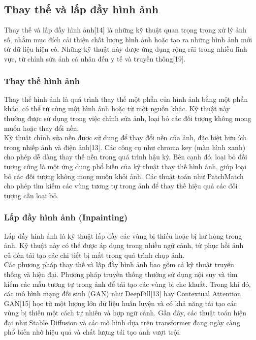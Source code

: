 \documentclass[12pt]{report}
\begin{document}
\subsection{Thay thế và lấp đầy hình ảnh}

Thay thế và lấp đầy hình ảnh[14] là những kỹ thuật quan trọng trong xử lý ảnh số, nhằm mục đích cải thiện chất lượng hình ảnh hoặc tạo ra những hình ảnh mới từ dữ liệu hiện có. Những kỹ thuật này được ứng dụng rộng rãi trong nhiều lĩnh vực, từ chỉnh sửa ảnh cá nhân đến y tế và truyền thông[19].

\subsubsection{Thay thế hình ảnh}

Thay thế hình ảnh là quá trình thay thế một phần của hình ảnh bằng một phần khác, có thể từ cùng một hình ảnh hoặc từ một nguồn khác. Kỹ thuật này thường được sử dụng trong việc chỉnh sửa ảnh, loại bỏ các đối tượng không mong muốn hoặc thay đổi nền.
\\Kỹ thuật chỉnh sửa nền được sử dụng để thay đổi nền của ảnh, đặc biệt hữu ích trong nhiếp ảnh và điện ảnh[13]. Các công cụ như chroma key (màn hình xanh) cho phép dễ dàng thay thế nền trong quá trình hậu kỳ. Bên cạnh đó, loại bỏ đối tượng cũng là một ứng dụng phổ biến của kỹ thuật thay thế hình ảnh, giúp loại bỏ các đối tượng không mong muốn khỏi ảnh. Các thuật toán như PatchMatch cho phép tìm kiếm các vùng tương tự trong ảnh để thay thế hiệu quả các đối tượng cần loại bỏ.

\subsubsection{Lấp đầy hình ảnh (Inpainting)}

Lấp đầy hình ảnh là kỹ thuật lấp đầy các vùng bị thiếu hoặc bị hư hỏng trong ảnh. Kỹ thuật này có thể được áp dụng trong nhiều ngữ cảnh, từ phục hồi ảnh cũ đến tái tạo các chi tiết bị mất trong quá trình chụp ảnh.
\\Các phương pháp thay thế và lấp đầy hình ảnh bao gồm cả kỹ thuật truyền thống và hiện đại. Phương pháp truyền thống thường sử dụng nội suy và tìm kiếm các mẫu tương tự trong ảnh để tái tạo các vùng bị che khuất. Trong khi đó, các mô hình mạng đối sinh (GAN) như DeepFill[13] hay Contextual Attention GAN[15] học từ một lượng lớn dữ liệu huấn luyện và có khả năng tái tạo các vùng bị thiếu một cách tự nhiên và hợp ngữ cảnh. Gần đây, các thuật toán hiện đại như Stable Diffusion và các mô hình dựa trên transformer đang ngày càng phổ biến nhờ hiệu quả và chất lượng tái tạo ảnh vượt trội.
\end{document}

